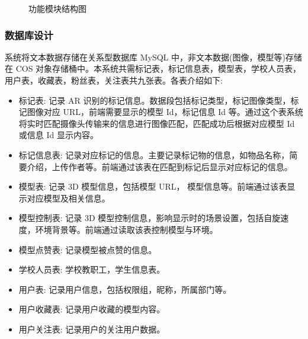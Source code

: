 \begin{figure}[H]
  \caption{功能模块结构图}
  \label{fig:功能模块结构图}
\end{figure}

\subsubsection{数据库设计}

系统将文本数据存储在关系型数据库 MySQL 中，非文本数据(图像，模型等)存储在 COS 对象存储桶中。本系统共需标记表，标记信息表，模型表，学校人员表，用户表，收藏表，粉丝表，关注表共九张表。各表介绍如下:
\begin{itemize}
  \item 标记表: 记录 AR 识别的标记信息。数据段包括标记类型，标记图像类型，标记图像对应 URL，前端需要显示的模型 Id，标记信息 Id 等。通过这个表系统将实时匹配摄像头传输来的信息进行图像匹配，匹配成功后根据对应模型 Id 或信息 Id 显示内容。
  \item 标记信息表: 记录对应标记的信息。主要记录标记物的信息，如物品名称，简要介绍，上传作者等。前端通过该表在匹配到标记后显示对应标记的信息。
  \item 模型表: 记录 3D 模型信息，包括模型 URL， 模型信息等。前端通过该表显示对应模型及相关信息。
  \item 模型控制表: 记录 3D 模型控制信息，影响显示时的场景设置，包括自旋速度，环境背景等。前端通过读取该表控制模型与环境。
  \item 模型点赞表: 记录模型被点赞的信息。
  \item 学校人员表: 学校教职工，学生信息表。
  \item 用户表: 记录用户信息，包括权限组，昵称，所属部门等。
  \item 用户收藏表: 记录用户收藏的模型内容。
  \item 用户关注表: 记录用户的关注用户数据。
\end{itemize}

